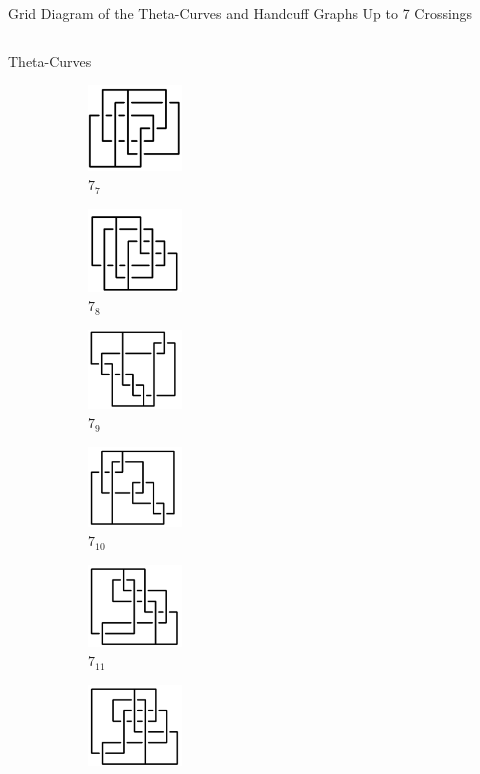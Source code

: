 \documentclass[final]{beamer}
\begin{document}
\begin{frame}[t]
\begin{alertblock}{Grid Diagram of the Theta-Curves and Handcuff Graphs Up to 7 Crossings}
\begin{columns}[t]
\begin{column}{0.7\textwidth}
\begin{alertblock}{Theta-Curves}
\begin{figure}
\begin{subfigure}{0.075\textwidth}
    \includegraphics[width=2.5cm]{../Midterm_Poster/grid_diagram/theta_7_7.png}
    \caption{$7_{7}$} 
    \end{subfigure}
    \begin{subfigure}{0.075\textwidth}
    \includegraphics[width=2.5cm]{../Midterm_Poster/grid_diagram/theta_7_8.png}
    \caption{$7_{8}$} 
    \end{subfigure}
    \begin{subfigure}{0.075\textwidth}
    \includegraphics[width=2.5cm]{../Midterm_Poster/grid_diagram/theta_7_9.png}
    \caption{$7_{9}$} 
    \end{subfigure}
    \begin{subfigure}{0.075\textwidth}
    \includegraphics[width=2.5cm]{../Midterm_Poster/grid_diagram/theta_7_10.png}
    \caption{$7_{10}$} 
    \end{subfigure}
    \begin{subfigure}{0.075\textwidth}
    \includegraphics[width=2.5cm]{../Midterm_Poster/grid_diagram/theta_7_11.png}
    \caption{$7_{11}$} 
    \end{subfigure}
    \begin{subfigure}{0.075\textwidth}
    \includegraphics[width=2.5cm]{../Midterm_Poster/grid_diagram/theta_7_12.png}

\end{subfigure}
\end{figure}
\end{alertblock}
\end{column}
\end{columns}
\end{alertblock}
\end{frame}
\end{document}
